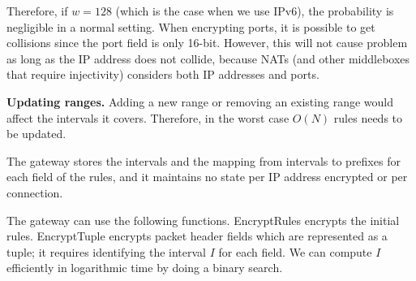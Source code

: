 Therefore, if $w=128$ (which is the case when we use IPv6), the probability is negligible in a normal setting. When encrypting ports, it is possible to get collisions since the port field is only 16-bit. However, this will not cause problem as long as the IP address does not collide, because NATs (and other middleboxes that require injectivity) considers both IP addresses and ports.








\noindent \textbf{Updating ranges.}
Adding a new range or removing an existing range would affect the intervals it covers. Therefore, in the worst case $O(N)$ rules needs to be updated. 




The gateway stores the intervals and the mapping from intervals to prefixes for each field of the rules, and it maintains no state per IP address encrypted or per connection.

The gateway can use the following functions. EncryptRules encrypts the initial rules. EncryptTuple encrypts packet header fields which are represented as a tuple; it requires identifying the interval $I$ for each field. We can compute $I$ efficiently in logarithmic time by doing a binary search. 




